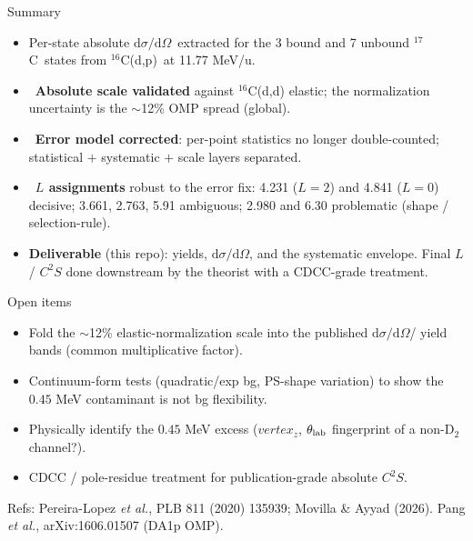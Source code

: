 \documentclass[aspectratio=169,11pt]{beamer}
\newcommand{\Cs}{$^{16}$C}
\newcommand{\Cse}{$^{17}$C}
\newcommand{\dpr}{(d,p)}
\newcommand{\dsdo}{$\mathrm{d}\sigma/\mathrm{d}\Omega$}
\newcommand{\good}{\textcolor{green!55!black}{\textbf{\checkmark}}}
\begin{document}
\begin{frame}{Summary}
  \begin{itemize}
    \item Per-state absolute \dsdo\ extracted for the 3 bound and 7 unbound
      \Cse\ states from \Cs\dpr\ at 11.77 MeV/u.
    \item \good\ \textbf{Absolute scale validated} against \Cs(d,d) elastic; the
      normalization uncertainty is the $\sim$12\% OMP spread (global).
    \item \good\ \textbf{Error model corrected}: per-point statistics no longer
      double-counted; statistical $+$ systematic $+$ scale layers separated.
    \item \good\ \textbf{$L$ assignments} robust to the error fix:
      4.231 ($L{=}2$) and 4.841 ($L{=}0$) decisive; 3.661, 2.763, 5.91 ambiguous;
      2.980 and 6.30 problematic (shape / selection-rule).
    \item \textbf{Deliverable} (this repo): yields, \dsdo, and the systematic
      envelope. Final $L$ / $C^2S$ done downstream by the theorist with a
      CDCC-grade treatment.
  \end{itemize}
\end{frame}

\begin{frame}{Open items}
  \begin{itemize}
    \item Fold the $\sim$12\% elastic-normalization scale into the published
      \dsdo / yield bands (common multiplicative factor).
    \item Continuum-form tests (quadratic/exp bg, PS-shape variation) to show the
      $0.45$ MeV contaminant is not bg flexibility.
    \item Physically identify the $0.45$ MeV excess ($vertex_z$, $\theta_{\rm lab}$
      fingerprint of a non-D$_2$ channel?).
    \item CDCC / pole-residue treatment for publication-grade absolute $C^2S$.
  \end{itemize}
  \vspace{1em}
  \centering
  \footnotesize Refs: Pereira-Lopez \textit{et al.}, PLB 811 (2020) 135939;
  Movilla \& Ayyad (2026). Pang \textit{et al.}, arXiv:1606.01507 (DA1p OMP).
\end{frame}
\end{document}
